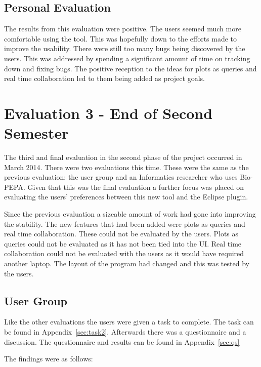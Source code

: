 \subsection{Personal Evaluation}

The results from this evaluation were positive.  The users seemed much more comfortable using the tool.  This was hopefully down to the efforts made to improve the usability.  There were still too many bugs being discovered by the users.  This was addressed by spending a significant amount of time on tracking down and fixing bugs.  The positive reception to the ideas for plots as queries and real time collaboration led to them being added as project goals.

\section{Evaluation 3 - End of Second Semester}
\label{sec:eval3}

The third and final evaluation in the second phase of the project occurred in March 2014.  There were two evaluations this time.  These were the same as the previous evaluation: the user group and an Informatics researcher who uses Bio-PEPA.  Given that this was the final evaluation a further focus was placed on evaluating the users' preferences between this new tool and the Eclipse plugin.

Since the previous evaluation a sizeable amount of work had gone into improving the stability.  The new features that had been added were plots as queries and real time collaboration.  These could not be evaluated by the users. Plots as queries could not be evaluated as it has not been tied into the \ac{UI}.  Real time collaboration could not be evaluated with the users as it would have required another laptop.  The layout of the program had changed and this was tested by the users.

\subsection{User Group}

Like the other evaluations the users were given a task to complete.  The task can be found in Appendix~\ref{sec:task2}. Afterwards there was a questionnaire and a discussion.  The questionnaire and results can be found in Appendix~\ref{sec:qs}

The findings were as follows:

